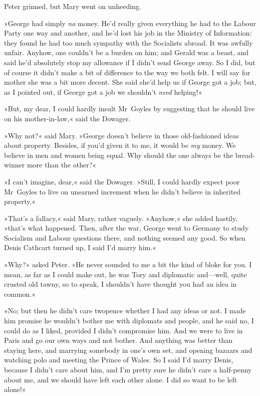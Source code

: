 Peter grinned, but Mary went on unheeding.

»George had simply \textit{no} money. He'd really given everything he had to the Labour Party one way and another, and he'd lost his job in the Ministry of Information: they found he had too much sympathy with the Socialists abroad. It was awfully unfair. Anyhow, one couldn't be a burden on him; and Gerald was a beast, and said he'd absolutely stop my allowance if I didn't send George away. So I did, but of course it didn't make a bit of difference to the way we both felt. I will say for mother she was a bit more decent. She said she'd help us if George got a job; but, as I pointed out, if George got a job we shouldn't \textit{need} helping!«

»But, my dear, I could hardly insult Mr~Goyles by suggesting that he should live on his mother-in-law,« said the Dowager.

»Why not?« said Mary. »George doesn't believe in those old-fashioned ideas about property. Besides, if you'd given it to me, it would be \textit{my} money. We believe in men and women being equal. Why should the one always be the bread-winner more than the other?«

»I can't imagine, dear,« said the Dowager. »Still, I could hardly expect poor Mr~Goyles to live on unearned increment when he didn't believe in inherited property.«

»That's a fallacy,« said Mary, rather vaguely. »Anyhow,« she added hastily, »that's what happened. Then, after the war, George went to Germany to study Socialism and Labour questions there, and nothing seemed any good. So when Denis Cathcart turned up, I said I'd marry him.«

»Why?« asked Peter. »He never sounded to me a bit the kind of bloke for you. I mean, as far as I could make out, he was Tory and diplomatic and—well, quite crusted old tawny, so to speak, I shouldn't have thought you had an idea in common.«

»No; but then he didn't care twopence whether I had any ideas or not. I made him promise he wouldn't bother me with diplomats and people, and he said no, I could do as I liked, provided I didn't compromise him.  And we were to live in Paris and go our own ways and not bother. And anything was better than staying here, and marrying somebody in one's own set, and opening bazaars and watching polo and meeting the Prince of Wales. So I said I'd marry Denis, because I didn't care about him, and I'm pretty sure he didn't care a half-penny about me, and we should have left each other alone. I did so want to be left alone!«

